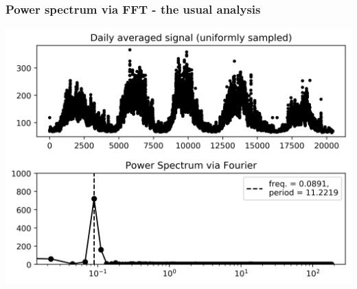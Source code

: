 \documentclass{beamer}
\begin{document}
\begin{frame}
\frametitle{Power spectrum via FFT - the usual analysis}
\begin{center}
\includegraphics[scale=0.55]{Figuras/original_365.jpg}
\end{center}
\end{frame}
\end{document}
